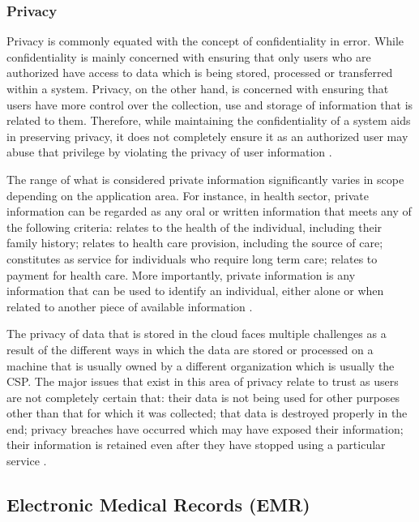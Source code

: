 \subsubsection*{Privacy}

Privacy is commonly equated with the concept of confidentiality in error. While confidentiality is mainly concerned with ensuring that only users who are authorized have access to data which is being stored, processed or transferred within a system. Privacy, on the other hand, is concerned with ensuring that users have more control over the collection, use and storage of information that is related to them. Therefore, while maintaining the confidentiality of a system aids in preserving privacy, it does not completely ensure it as an authorized user may abuse that privilege by violating the privacy of user information \cite{pearsonprivacy}.

The range of what is considered private information significantly varies in scope depending on the application area. For instance, in health sector, private information can be regarded as any oral or written information that meets any of the following criteria: relates to the health of the individual, including their family history; relates to health care provision, including the source of care; constitutes as service for individuals who require long term care; relates to payment for health care. More importantly, private information is any information that can be used to identify an individual, either alone or when related to another piece of available information \cite{annpia}.

The privacy of data that is stored in the cloud faces multiple challenges as a result of the different ways in which the data are stored or processed on a machine that is usually owned by a different organization which is usually the CSP. The major issues that exist in this area of privacy relate to trust as users are not completely certain that: their data is not being used for other purposes other than that for which it was collected; that data is destroyed properly in the end; privacy breaches have occurred which may have exposed their information; their information is retained even after they have stopped using a particular service \cite{pearsonprivacy}.



\subsection{Electronic Medical Records (EMR)}

